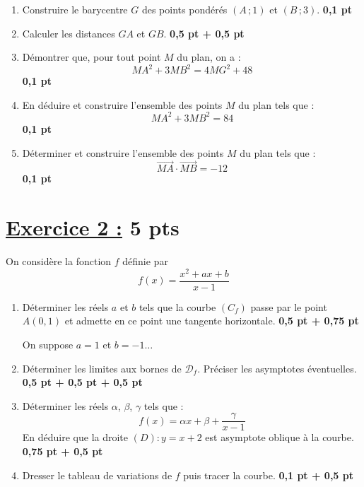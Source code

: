 \documentclass[12pt,a4paper]{article}
\begin{document}
\begin{enumerate}
    \item Construire le barycentre \( G \) des points pondérés \( (A\,;1) \) et \( (B\,;3) \). \hfill \textbf{0{,}1 pt}
    
    \item Calculer les distances \( GA \) et \( GB \). \hfill \textbf{0{,}5 pt + 0{,}5 pt}
    
    \item Démontrer que, pour tout point \( M \) du plan, on a :
    \[
    MA^2 + 3MB^2 = 4MG^2 + 48
    \]
    \hfill \textbf{0{,}1 pt}
    
    \item En déduire et construire l'ensemble des points \( M \) du plan tels que :
    \[
    MA^2 + 3MB^2 = 84
    \]
    \hfill \textbf{0{,}1 pt}
    
    \item Déterminer et construire l'ensemble des points \( M \) du plan tels que :
    \[
    \overrightarrow{MA} \cdot \overrightarrow{MB} = -12
    \]
    \hfill \textbf{0{,}1 pt}
\end{enumerate}


\section*{\underline{Exercice 2 :} 5 pts }

On considère la fonction \( f \) définie par 
\[
f(x) = \frac{x^2 + ax + b}{x - 1}
\]

\begin{enumerate}
    \item Déterminer les réels \( a \) et \( b \) tels que la courbe \( (C_f) \) passe par le point \( A(0,1) \) et admette en ce point une tangente horizontale. \hfill \textbf{0{,}5 pt + 0{,}75 pt}
    
    On suppose \( a = 1 \) et \( b = -1 \dots \)
    
    \item Déterminer les limites aux bornes de \( \mathcal{D}_f \). Préciser les asymptotes éventuelles. \hfill \textbf{0{,}5 pt + 0{,}5 pt + 0{,}5 pt}
    
    \item Déterminer les réels \( \alpha \), \( \beta \), \( \gamma \) tels que :
    \[
    f(x) = \alpha x + \beta + \frac{\gamma}{x - 1}
    \]
    En déduire que la droite \( (D) : y = x + 2 \) est asymptote oblique à la courbe. \hfill \textbf{0{,}75 pt + 0{,}5 pt}
    
    \item Dresser le tableau de variations de \( f \) puis tracer la courbe. \hfill \textbf{0{,}1 pt + 0{,}5 pt}
\end{enumerate}
\end{document}

